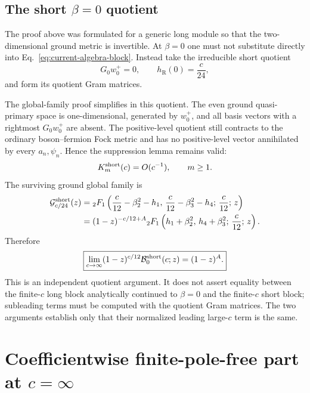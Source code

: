 \documentclass[11pt]{article}
\newcommand{\R}{\mathrm R}
\newcommand{\B}{\mathcal B}
\begin{document}
\subsection{The short \(\beta=0\) quotient}

The proof above was formulated for a generic long module so that the
two-dimensional ground metric is invertible.  At \(\beta=0\) one must
not substitute directly into Eq.~\eqref{eq:current-algebra-block}.
Instead take the irreducible short quotient
\begin{equation}
 G_0w_0^+=0,
 \qquad
 h_\R(0)=\frac c{24},
 \label{eq:short-ground}
\end{equation}
and form its quotient Gram matrices.

The global-family proof simplifies in this quotient.  The even ground
quasi-primary space is one-dimensional, generated by \(w_0^+\), and
all basis vectors with a rightmost \(G_0w_0^+\) are absent.  The
positive-level quotient still contracts to the ordinary boson--fermion
Fock metric and has no positive-level vector annihilated by every
\(a_n,\psi_n\).  Hence the suppression lemma remains valid:
\begin{equation}
 K_m^{\rm short}(c)=O(c^{-1}),
 \qquad m\ge1.
 \label{eq:short-quasiprimary-suppression}
\end{equation}
The surviving ground global family is
\begin{align}
 \mathcal G_{c/24}^{\rm short}(z)
 ={}&
 {}_2F_1\left(
 \frac c{12}-\beta_2^2-h_1,\,
 \frac c{12}-\beta_3^2-h_4;\,
 \frac c{12};\,z\right)
 \notag\\
 ={}&
 (1-z)^{-c/12+A}
 {}_2F_1\left(
 h_1+\beta_2^2,\,
 h_4+\beta_3^2;\,
 \frac c{12};\,z\right).
 \label{eq:short-global-family}
\end{align}
Therefore
\begin{equation}
 \boxed{
 \lim_{c\to\infty}(1-z)^{c/12}
 \B_{0}^{\rm short}(c;z)
 =(1-z)^A.}
 \label{eq:short-local-seed}
\end{equation}
This is an independent quotient argument.  It does not assert equality
between the finite-\(c\) long block analytically continued to
\(\beta=0\) and the finite-\(c\) short block; subleading terms must be
computed with the quotient Gram matrices.  The two arguments establish
only that their normalized leading large-\(c\) term is the same.

\section{Coefficientwise finite-pole-free part at
\texorpdfstring{\(c=\infty\)}{c=infinity}}
\label{sec:coefficientwise-infinity}
\end{document}
